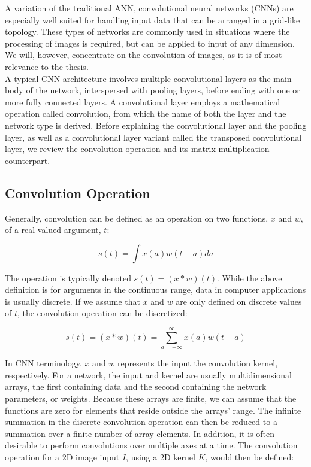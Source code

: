 A variation of the traditional ANN, convolutional neural networks (CNNs) are especially well suited for handling input data that can be arranged in a grid-like topology. These types of networks are commonly used in situations where the processing of images is required, but can be applied to input of any dimension. We will, however, concentrate on the convolution of images, as it is of most relevance to the thesis. \\

\noindent A typical CNN architecture involves multiple convolutional layers as the main body of the network, interspersed with pooling layers, before ending with one or more fully connected layers. A convolutional layer employs a mathematical operation called convolution, from which the name of both the layer and the network type is derived. Before explaining the convolutional layer and the pooling layer, as well as a convolutional layer variant called the transposed convolutional layer, we review the convolution operation and its matrix multiplication counterpart.

\subsection{Convolution Operation}

Generally, convolution can be defined as an operation on two functions, $x$ and $w$, of a real-valued argument, $t$:

\[ s(t) = \int x(a)w(t-a) da \]

\noindent The operation is typically denoted $s(t) = (x*w)(t)$. While the above definition is for arguments in the continuous range, data in computer applications is usually discrete. If we assume that $x$ and $w$ are only defined on discrete values of $t$, the convolution operation can be discretized:

\[ s(t) = (x*w)(t) = \sum_{a=-\infty}^{\infty} x(a)w(t-a) \]

\noindent In CNN terminology, $x$ and $w$ represents the input the convolution kernel, respectively. For a network, the input and kernel are usually multidimensional arrays, the first containing data and the second containing the network parameters, or weights. Because these arrays are finite, we can assume that the functions are zero for elements that reside outside the arrays' range. The infinite summation in the discrete convolution operation can then be reduced to a summation over a finite number of array elements. In addition, it is often desirable to perform convolutions over multiple axes at a time. The convolution operation for a 2D image input $I$, using a 2D kernel $K$, would then be defined:

